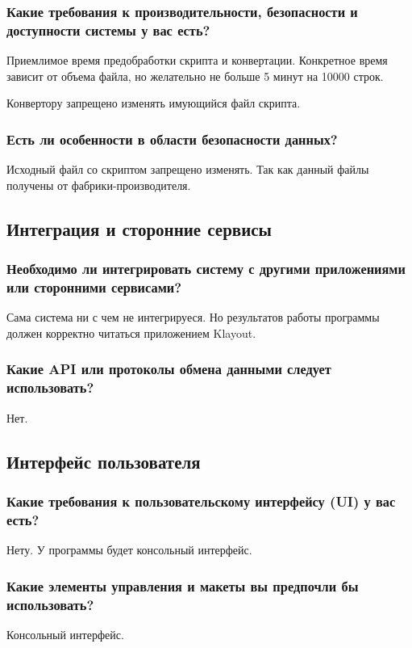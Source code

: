 \subsubsection{Какие требования к производительности,
	безопасности и доступности системы у вас есть?}
Приемлимое время предобработки скрипта и конвертации.
Конкретное время зависит от объема файла,
но желательно не больше 5 минут на 10000 строк.\par
Конвертору запрещено изменять имующийся файл скрипта.

\subsubsection{Есть ли особенности в области безопасности данных?}
Исходный файл со скриптом запрещено изменять. Так как данный файлы получены
от фабрики-производителя.

\subsection{Интеграция и сторонние сервисы}

\subsubsection{Необходимо ли интегрировать систему с другими приложениями
	или сторонними сервисами?}
Сама система ни с чем не интегрируеся. Но результатов работы 
программы должен корректно читаться приложением Klayout.

\subsubsection{Какие API или протоколы обмена данными следует использовать?}
Нет.

\subsection{Интерфейс пользователя}

\subsubsection{Какие требования к пользовательскому интерфейсу (UI) у вас есть?}
Нету. У программы будет консольный интерфейс.

\subsubsection{Какие элементы управления и макеты вы предпочли бы использовать?}
Консольный интерфейс.

